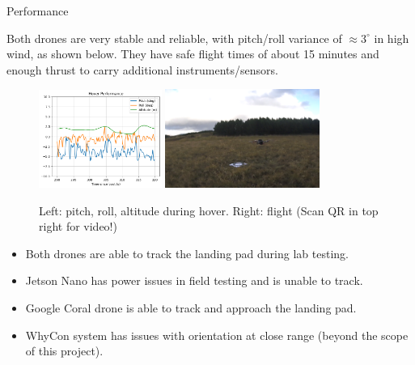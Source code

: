 \documentclass[final, 20pt]{beamer}
\newlength{\colwidth}
\begin{document}
\begin{frame}[t]
\begin{columns}[t]
\begin{column}{\colwidth}

  \begin{alertblock}{Performance}

      Both drones are very stable and reliable, with pitch/roll variance of $\approx 3^{\circ}$ in high wind, as shown below.
      They have safe flight times of about 15 minutes and enough thrust to carry additional instruments/sensors.
      \begin{figure}
        \includegraphics[width=0.3575\textwidth]{stability.png}
        \hspace{1cm}
        \includegraphics[width=0.45\textwidth]{drone_in_flight.png}
        \caption*{Left: pitch, roll, altitude during hover. Right: flight (Scan QR in top right for video!)}
      \end{figure}

    \vspace{-0.5cm}

      \begin{itemize}
        \item Both drones are able to track the landing pad during lab testing.
        \item Jetson Nano has power issues in field testing and is unable to track.
        \item Google Coral drone is able to track and approach the landing pad.
        \item WhyCon system has issues with orientation at close range (beyond the scope of this project).
      \end{itemize}



\end{alertblock}
\end{column}
\end{columns}
\end{frame}
\end{document}
